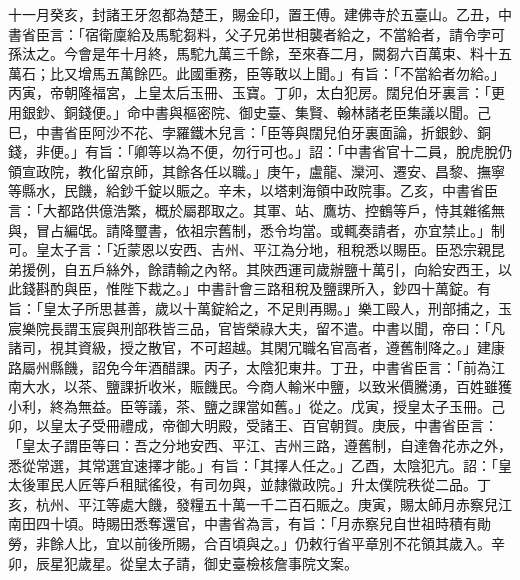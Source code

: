 \begin{pinyinscope}
 十一月癸亥，封諸王牙忽都為楚王，賜金印，置王傅。建佛寺於五臺山。乙丑，中書省臣言：「宿衛廩給及馬駝芻料，父子兄弟世相襲者給之，不當給者，請令孛可孫汰之。今會是年十月終，馬駝九萬三千餘，至來春二月，闕芻六百萬束、料十五萬石；比又增馬五萬餘匹。此國重務，臣等敢以上聞。」有旨：「不當給者勿給。」丙寅，帝朝隆福宮，上皇太后玉冊、玉寶。丁卯，太白犯房。闊兒伯牙裏言：「更用銀鈔、銅錢便。」命中書與樞密院、御史臺、集賢、翰林諸老臣集議以聞。己巳，中書省臣阿沙不花、孛羅鐵木兒言：「臣等與闊兒伯牙裏面論，折銀鈔、銅錢，非便。」有旨：「卿等以為不便，勿行可也。」詔：「中書省官十二員，脫虎脫仍領宣政院，教化留京師，其餘各任以職。」庚午，盧龍、灤河、遷安、昌黎、撫寧等縣水，民饑，給鈔千錠以賑之。辛未，以塔剌海領中政院事。乙亥，中書省臣言：「大都路供億浩繁，概於屬郡取之。其軍、站、鷹坊、控鶴等戶，恃其雜徭無與，冒占編氓。請降璽書，依祖宗舊制，悉令均當。或輒奏請者，亦宜禁止。」制可。皇太子言：「近蒙恩以安西、吉州、平江為分地，租稅悉以賜臣。臣恐宗親昆弟援例，自五戶絲外，餘請輸之內帑。其陜西運司歲辦鹽十萬引，向給安西王，以此錢斟酌與臣，惟陛下裁之。」中書計會三路租稅及鹽課所入，鈔四十萬錠。有旨：「皇太子所思甚善，歲以十萬錠給之，不足則再賜。」樂工毆人，刑部捕之，玉宸樂院長謂玉宸與刑部秩皆三品，官皆榮祿大夫，留不遣。中書以聞，帝曰：「凡諸司，視其資級，授之散官，不可超越。其閑冗職名官高者，遵舊制降之。」建康路屬州縣饑，詔免今年酒醋課。丙子，太陰犯東井。丁丑，中書省臣言：「前為江南大水，以茶、鹽課折收米，賑饑民。今商人輸米中鹽，以致米價騰湧，百姓雖獲小利，終為無益。臣等議，茶、鹽之課當如舊。」從之。戊寅，授皇太子玉冊。己卯，以皇太子受冊禮成，帝御大明殿，受諸王、百官朝賀。庚辰，中書省臣言：「皇太子謂臣等曰：吾之分地安西、平江、吉州三路，遵舊制，自達魯花赤之外，悉從常選，其常選宜速擇才能。」有旨：「其擇人任之。」乙酉，太陰犯亢。詔：「皇太後軍民人匠等戶租賦徭役，有司勿與，並隸徽政院。」升太僕院秩從二品。丁亥，杭州、平江等處大饑，發糧五十萬一千二百石賑之。庚寅，賜太師月赤察兒江南田四十頃。時賜田悉奪還官，中書省為言，有旨：「月赤察兒自世祖時積有勛勞，非餘人比，宜以前後所賜，合百頃與之。」仍敕行省平章別不花領其歲入。辛卯，辰星犯歲星。從皇太子請，御史臺檢核詹事院文案。




\end{pinyinscope}
